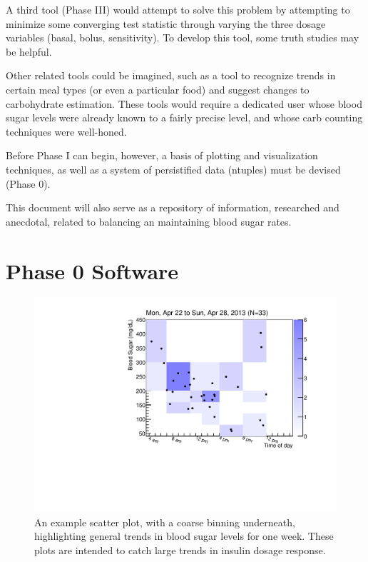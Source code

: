 A third tool (Phase III) would attempt to solve this problem by attempting to minimize some converging test statistic through varying the three dosage variables (basal, bolus, sensitivity). To develop this tool, some truth studies may be helpful.

Other related tools could be imagined, such as a tool to recognize trends in certain meal types (or even a particular food) and suggest changes to carbohydrate estimation. These tools would require a dedicated user whose blood sugar levels were already known to a fairly precise level, and whose carb counting techniques were well-honed.

Before Phase I can begin, however, a basis of plotting and visualization techniques, as well as a system of persistified data (ntuples) must be devised (Phase 0).

This document will also serve as a repository of information, researched and anecdotal, related to balancing an maintaining blood sugar rates.


\section{Phase 0 Software}

\begin{figure}[htbp]
\begin{center}
\includegraphics[width=4.5in]{figures/example_weekly.pdf}
\caption{An example scatter plot, with a coarse binning underneath, highlighting general trends in blood sugar levels for one week. These plots are intended to catch large trends in insulin dosage response.}
\label{default}
\end{center}
\end{figure}

